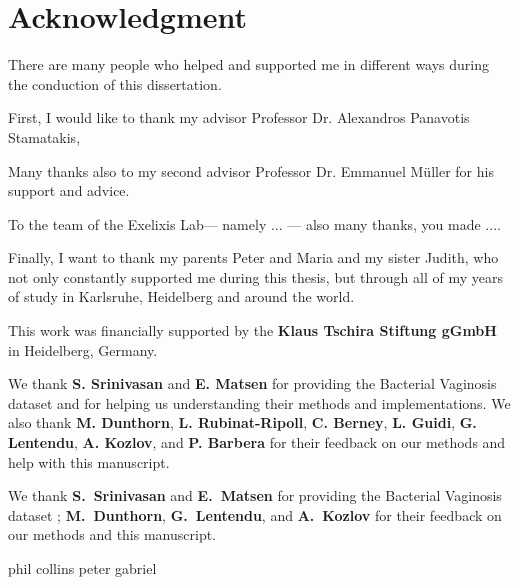 \section*{Acknowledgment}
\vspace*{1em}

There are many people who helped and supported me in different ways during the conduction of this dissertation.

First, I would like to thank my advisor Professor Dr. Alexandros Panavotis Stamatakis,

Many thanks also to my second advisor Professor Dr. Emmanuel Müller for his support and advice.

To the team of the Exelixis Lab--- namely ... --- also many thanks, you made ....

Finally, I want to thank my parents Peter and Maria and my sister Judith,
who not only constantly supported me during this thesis,
but through all of my years of study in Karlsruhe, Heidelberg and around the world.


This work was financially supported by the \textbf{Klaus Tschira Stiftung gGmbH} in Heidelberg, Germany.

We thank \textbf{S. Srinivasan} and \textbf{E. Matsen}
for providing the Bacterial Vaginosis dataset \cite{Srinivasan2012}
and for helping us understanding their methods and implementations.
We also thank \textbf{M. Dunthorn}, \textbf{L. Rubinat-Ripoll}, \textbf{C. Berney}, \textbf{L. Guidi},
\textbf{G. Lentendu}, %
\textbf{A. Kozlov}, and \textbf{P. Barbera}
for their feedback on our methods and help with this manuscript.

We thank \textbf{S.~Srinivasan} and \textbf{E.~Matsen}
for providing the Bacterial Vaginosis dataset \citep{Srinivasan2012};
\textbf{M.~Dunthorn}, \textbf{G.~Lentendu}, %
and \textbf{A.~Kozlov}
for their feedback on our methods and this manuscript.

phil collins peter gabriel




